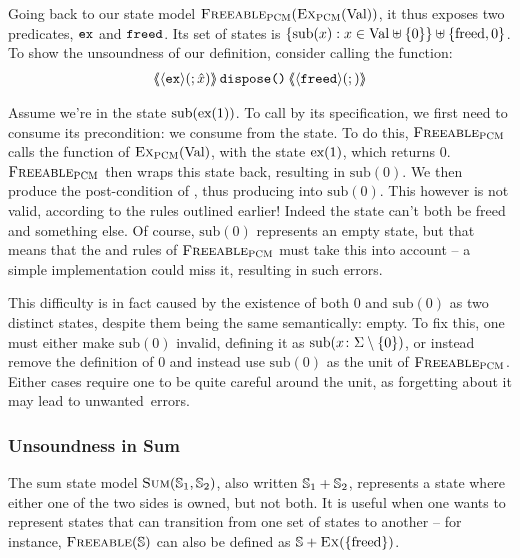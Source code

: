 Going back to our state model $\textsc{Freeable}_{\textsc{PCM}}(\textsc{Ex}_{\textsc{PCM}}(\text{Val}))$, it thus exposes two predicates, $\texttt{ex}$ and $\texttt{freed}$. Its set of states is $\{\text{sub}(x) : x \in \text{Val} \uplus \{ 0 \} \} \uplus \{ \text{freed}, 0 \}$. To show the unsoundness of our definition, consider calling the  function:
\begin{align*}
	\left<\mkern-5mu\left<\left<\texttt{ex}\right>\!(;\hat{x})\right>\mkern-5mu\right>\texttt{dispose()}\left<\mkern-5mu\left<\left<\texttt{freed}\right>\!(;)\right>\mkern-5mu\right>
\end{align*}

Assume we're in the state $\text{sub}(\text{ex}(1))$. To call  by its specification, we first need to consume its precondition: we consume  from the state. To do this, $\textsc{Freeable}_{\textsc{PCM}}$ calls the \consume{} function of $\textsc{Ex}_{\textsc{PCM}}(\text{Val})$, with the state $\text{ex}(1)$, which returns $0$. $\textsc{Freeable}_{\textsc{PCM}}$ then wraps this state back, resulting in $\text{sub}(0)$. We then produce the post-condition of , thus producing \corepred{\freedP}{}{} into $\text{sub}(0)$. This however is not valid, according to the rules outlined earlier! Indeed the state can't both be freed and something else. Of course, $\text{sub}(0)$ represents an empty state, but that means that the \consume{} and \produce{} rules of $\textsc{Freeable}_{\textsc{PCM}}$ must take this into account -- a simple implementation could miss it, resulting in such errors.

This difficulty is in fact caused by the existence of both $0$ and $\text{sub}(0)$ as two distinct states, despite them being the same semantically: empty. To fix this, one must either make $\text{sub}(0)$ invalid, defining it as $\text{sub}(x\colon \Sigma \setminus \{0\})$, or instead remove the definition of $0$ and instead use $\text{sub}(0)$ as the unit of $\textsc{Freeable}_{\textsc{PCM}}$. Either cases require one to be quite careful around the unit, as forgetting about it may lead to unwanted~errors.

\subsubsection{Unsoundness in Sum}\label{sec:unsoundness-in-sum}

The sum state model $\textsc{Sum}(\mathbb S_1, \mathbb S_2)$, also written $\mathbb S_1 + \mathbb S_2$, represents a state where either one of the two sides is owned, but not both. It is useful when one wants to represent states that can transition from one set of states to another -- for instance, $\textsc{Freeable}(\mathbb S)$ can also be defined as $\mathbb S + \textsc{Ex}(\{\text{freed}\})$.

